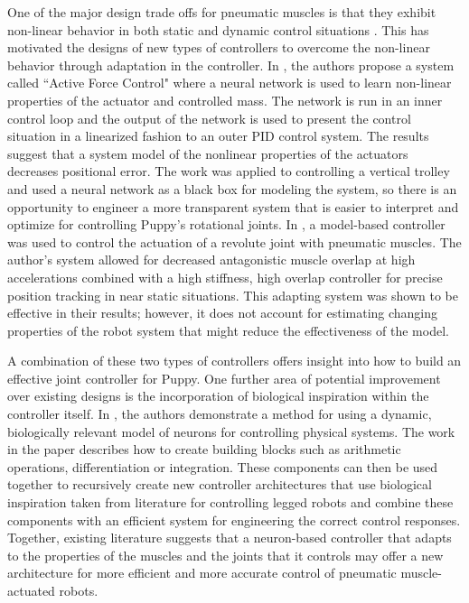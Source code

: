 One of the major design trade offs for pneumatic muscles is that they exhibit
non-linear behavior in both static and dynamic control situations \cite{HuntPMuscles, DynamicPMuscles}. This has
motivated the designs of new types of controllers to overcome the non-linear
behavior through adaptation in the controller. In \cite{Jahanabadi2009}, the
authors propose a system called ``Active Force Control" where a neural network
is used to learn non-linear properties of the actuator and controlled mass.
The network is run in an inner control loop and the output of the network is
used to present the control situation in a linearized fashion to an outer PID
control system. The results suggest that a system model of the nonlinear
properties of the actuators decreases positional error. The work was
applied to controlling a vertical trolley and used a neural network as a black
box for modeling the system, so there is an opportunity to engineer a more transparent system that is easier to interpret and optimize for controlling Puppy's rotational joints.
In \cite{Wang2013}, a model-based controller was used to control the actuation
of a revolute joint with pneumatic muscles. The author's system allowed for
decreased antagonistic muscle overlap at high accelerations combined with a
high stiffness, high overlap controller for precise position tracking in near
static situations. This adapting system was shown to be effective in their
results; however, it does not account for estimating changing properties of the
robot system that might reduce the effectiveness of the model.

A combination of these two types of controllers offers insight into how to build
an effective joint controller for Puppy. One further area of potential
improvement over existing designs is the incorporation of biological inspiration
within the controller itself. In \cite{NickFunctionalSubnetwork}, the authors
demonstrate a method for using a dynamic, biologically relevant model of neurons for controlling physical systems. The work in the
paper describes how to create building blocks such as arithmetic operations,
differentiation or integration. These components can then be used together to
recursively create new controller architectures that use biological inspiration
taken from literature for controlling legged robots and combine these components with an
efficient system for engineering the correct control responses. Together,
existing literature suggests that a neuron-based controller that adapts to the
properties of the muscles and the joints that it controls may offer a new
architecture for more efficient and more accurate control of pneumatic muscle-
actuated robots.

